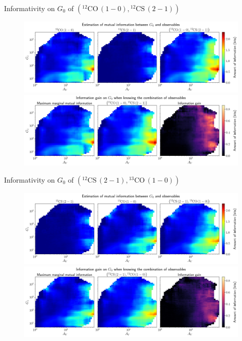 \documentclass{beamer}
\begin{document}
\begin{frame}{Informativity on $G_0$ of $\left(\mathrm{^{12}CO\,(1-0)},\mathrm{^{12}CS\,(2-1)}\right)$}
    \begin{figure}
        \centering
        \includegraphics[width=0.95\linewidth]{../mi/g0__12co10_12cs21_mi.png}
        \vfill
        \includegraphics[width=0.95\linewidth]{../mi/g0__12co10_12cs21_mi_gain.png}
    \end{figure}
\end{frame}

\begin{frame}{Informativity on $G_0$ of $\left(\mathrm{^{12}CS\,(2-1)},\mathrm{^{13}CO\,(1-0)}\right)$}
    \begin{figure}
        \centering
        \includegraphics[width=0.95\linewidth]{../mi/g0__12cs21_13co10_mi.png}
        \vfill
        \includegraphics[width=0.95\linewidth]{../mi/g0__12cs21_13co10_mi_gain.png}
    \end{figure}
\end{frame}
\end{document}
